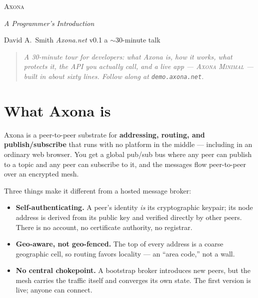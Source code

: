 \documentclass[nobib]{tufte-handout}
\begin{document}
\pagestyle{axonaplain}

\begin{center}
{\fontsize{34}{38}\selectfont \textsc{Axona}\par}
\vspace{0.35em}
{\Large\itshape A Programmer's Introduction\par}
\vspace{0.5em}
{\small David A.~Smith \quad\textperiodcentered\quad \emph{Axona.net} \quad\textperiodcentered\quad v0.1 \quad\textperiodcentered\quad a $\sim$30-minute talk\par}
\end{center}

\vspace{0.3em}
\noindent\begin{quote}\itshape\color{inkmuted}
A 30-minute tour for developers: what Axona is, how it works, what protects it,
the API you actually call, and a live app --- \textsc{Axona Minimal} --- built in
about sixty lines. Follow along at \texttt{demo.axona.net}.
\end{quote}
\vspace{0.4em}

\section{What Axona is}

Axona is a peer-to-peer substrate for \textbf{addressing, routing, and
publish/subscribe} that runs with no platform in the middle --- including in an
ordinary web browser. You get a global pub/sub bus
where any peer can publish to a topic and any peer can subscribe to it, and the
messages flow peer-to-peer over an encrypted mesh.

Three things make it different from a hosted message broker:

\begin{itemize}
\item \textbf{Self-authenticating.} A peer's identity \emph{is} its
cryptographic keypair; its node address is derived from its public key and
verified directly by other peers. There is no account, no certificate authority,
no registrar.
\item \textbf{Geo-aware, not geo-fenced.} The top of every address is a coarse
geographic cell, so routing favors locality --- an ``area code,'' not a wall.
\item \textbf{No central chokepoint.} A bootstrap broker introduces new peers,
but the mesh carries the traffic itself and converges its own state. The first
version is live; anyone can connect.
\end{itemize}
\end{document}
